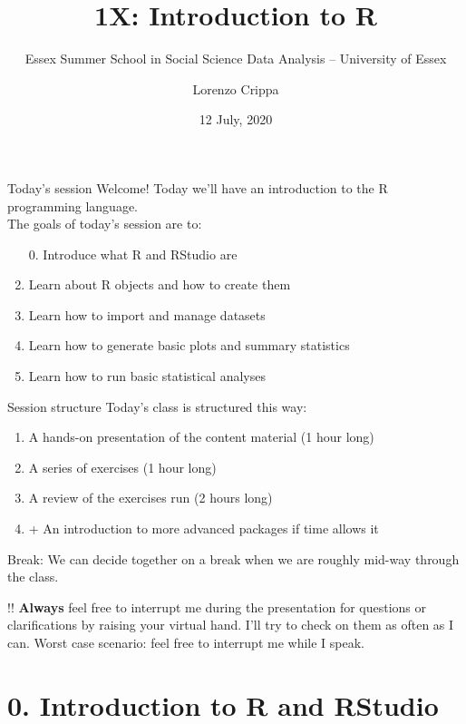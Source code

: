 \documentclass[xcolor=table,dvipsnames]{beamer}
\title{1X: Introduction to R}
\subtitle{Essex Summer School in Social Science Data Analysis -- University of Essex}
\date{12 July, 2020}
\author{Lorenzo Crippa}
\institute{University of Essex -- Department of Government}
\begin{document}
\begin{frame}[plain]
\begin{center}
\titlepage
\end{center}
\end{frame}

\begin{frame}{Today's session}
Welcome! Today we'll have an introduction to the R programming language. \\ \pause
The goals of today's session are to: \pause
\begin{enumerate}
\item[0.] Introduce what R and RStudio are \pause
\item Learn about R objects and how to create them \pause
\item Learn how to import and manage datasets \pause
\item Learn how to generate basic plots and summary statistics \pause
\item Learn how to run basic statistical analyses
\end{enumerate}
\end{frame}

\begin{frame}{Session structure}
Today's class is structured this way: \pause
\begin{enumerate}
\item A hands-on presentation of the content material (1 hour long) \pause
\item A series of exercises (1 hour long) \pause
\item A review of the exercises run (2 hours long) \pause
\item + An introduction to more advanced packages if time allows it \pause
\end{enumerate}

Break: We can decide together on a break when we are roughly mid-way through the class. \pause

!! \textbf{Always} feel free to interrupt me during the presentation for questions or clarifications by raising your virtual hand. I'll try to check on them as often as I can. \pause Worst case scenario: feel free to interrupt me while I speak.
\end{frame}

\section{0. Introduction to R and RStudio}
\end{document}
